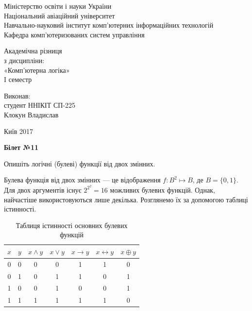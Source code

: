 \documentclass[a4paper,oneside,DIV=12,12pt]{scrartcl}
\newcommand{\sheetno}[1]{{\centering\Large\bfseries Білет №#1\par}}
\renewcommand{\implies}{\rightarrow}
\newcommand{\logicequiv}{\leftrightarrow}
\begin{document}
	\begin{titlepage}
		\begin{center}
			Міністерство освіти і науки України\\
			Національний авіаційний університет\\
			Навчально-науковий інститут комп'ютерних інформаційних технологій\\
			Кафедра комп'ютеризованих систем управління
			
			\vspace{\fill}
				Академічна різниця\\
				з дисципліни:\\
				«Комп'ютерна логіка»\\
				I семестр
				
			\vspace{\fill}
			
			\begin{flushright}
				Виконав:\\
				студент ННІКІТ СП-225\\
				Клокун Владислав\\
			\end{flushright}
			Київ 2017
		\end{center}
	\end{titlepage}
	
	\sheetno{11}
	
	\begin{exercise}
		Опишіть логічні (булеві) функції від двох змінних.
	\end{exercise}
	
	\begin{solution}
		Булева функція від двох змінних --- це відображення $f\colon B^2 \mapsto B$, де $B = \{0, 1\}$. Для двох аргументів існує $2^{2^2} = 16$ можливих булевих функцій. Однак, найчастіше використовуються лише декілька. Розглянемо їх за допомогою таблиці істинності.
		
		\begin{table}[!htbp]
		\centering
			\begin{tabular}{ccccccc}
				\toprule
					$x$ & $y$ & $x \land y$ & $x \lor y$ & $x \implies y$ & $x \logicequiv y$ & $x \oplus y $\\
				\midrule
					0   & 0   & 0           & 0          & 1              & 1                 & 0\\
					0   & 1   & 0           & 1          & 1              & 0                 & 1\\
					1   & 0   & 0           & 1          & 0              & 0                 & 1\\
					1   & 1   & 1           & 1          & 1              & 1                 & 0\\
				\bottomrule
			\end{tabular}
		\caption{Таблиця істинності основних булевих функцій}
		\label{fig:bool-functioins-truth-table}
		\end{table}
	\end{solution}
	
\end{document}
